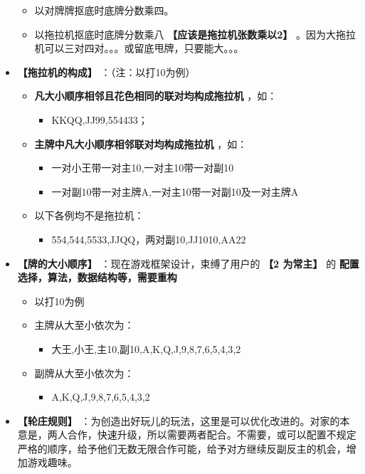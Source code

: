 \documentclass[9pt, b5paper]{article}
\begin{document}
\begin{itemize}
\begin{itemize}
\item 以对牌牌抠底时底牌分数乘四。
\item 以拖拉机抠底时底牌分数乘八 \textbf{【应该是拖拉机张数乘以2】} 。因为大拖拉机可以三对四对。。。或留底甩牌，只要能大。。。
\end{itemize}
\item \textbf{【拖拉机的构成】} ：（注：以打10为例）
\begin{itemize}
\item \textbf{凡大小顺序相邻且花色相同的联对均构成拖拉机} ，如：
\begin{itemize}
\item KKQQ,JJ99,554433；
\end{itemize}
\item \textbf{主牌中凡大小顺序相邻联对均构成拖拉机} ，如：
\begin{itemize}
\item 一对小王带一对主10,一对主10带一对副10
\item 一对副10带一对主牌A,一对主10带一对副10及一对主牌A
\end{itemize}
\item 以下各例均不是拖拉机：
\begin{itemize}
\item 554,544,5533,JJQQ，两对副10,JJ1010,AA22
\end{itemize}
\end{itemize}
\item \textbf{【牌的大小顺序】} ：现在游戏框架设计，束缚了用户的 \textbf{【2 为常主】} 的 \textbf{配置选择，算法，数据结构等，需要重构}
\begin{itemize}
\item 以打10为例
\item 主牌从大至小依次为：
\begin{itemize}
\item 大王,小王,主10,副10,A,K,Q,J,9,8,7,6,5,4,3,2
\end{itemize}
\item 副牌从大至小依次为：
\begin{itemize}
\item A,K,Q,J,9,8,7,6,5,4,3,2
\end{itemize}
\end{itemize}
\item \textbf{【轮庄规则】} ：为创造出好玩儿的玩法，这里是可以优化改进的。对家的本意是，两人合作，快速升级，所以需要两者配合。不需要，或可以配置不规定严格的顺序，给予他们无数无限合作可能，给予对方继续反副反主的机会，增加游戏趣味。
\begin{itemize}

\end{itemize}
\end{itemize}
\end{document}
